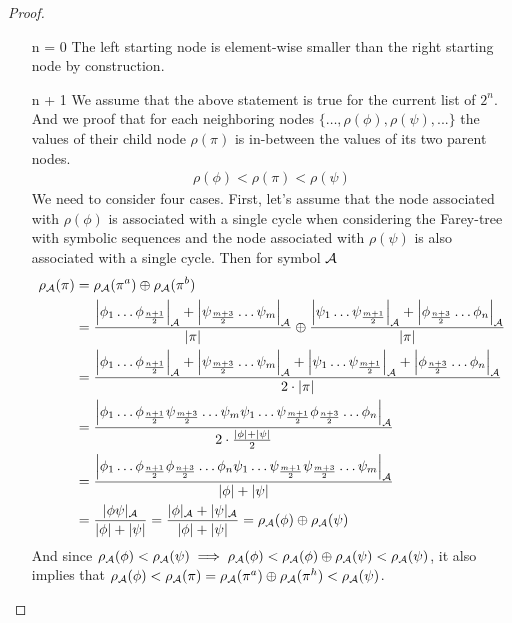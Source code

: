 \begin{proof}
	\begin{itemize}
		\item[n = 0] The left starting node is element-wise smaller than the right starting node by construction.
		\item[n + 1] We assume that the above statement is true for the current list of $2^n$.
			And we proof that for each neighboring nodes $\{\dots ,\rho(\phi), \rho(\psi), ...\}$ the values of their child node $\rho(\pi)$ is in-between the values of its two parent nodes.
			\begin{align*}
				\rho(\phi) < \rho(\pi) < \rho(\psi)
			\end{align*}
			We need to consider four cases.
			First, let's assume that the node associated with $\rho(\phi)$ is associated with a single cycle when considering the Farey-tree with symbolic sequences and the node associated with $\rho(\psi)$ is also associated with a single cycle.
			Then for symbol $\mathcal{A}$
			\begin{align*}
				\rho_{\mathcal{A}}(\pi) & = \rho_{\mathcal{A}}(\pi^a) \oplus \rho_{\mathcal{A}}(\pi^b)                                                                       \\
				             & =
				\dfrac{\left|\phi_1 \dots \phi_{\frac{n+1}{2}}\right|_{\mathcal{A}} + \left|\psi_{\frac{m+3}{2}} \dots \psi_m\right|_{\mathcal{A}}}{|\pi|}
				\oplus \dfrac{\left|\psi_1 \dots \psi_{\frac{m+1}{2}}\right|_{\mathcal{A}} + \left|\phi_{\frac{n+3}{2}} \dots \phi_n\right|_{\mathcal{A}}}{|\pi|} \\
				             & =
				\dfrac
				{\left|\phi_1 \dots \phi_{\frac{n+1}{2}}\right|_{\mathcal{A}} + \left|\psi_{\frac{m+3}{2}} \dots \psi_m\right|_{\mathcal{A}} + \left|\psi_1 \dots \psi_{\frac{m+1}{2}}\right|_{\mathcal{A}} + \left|\phi_{\frac{n+3}{2}} \dots \phi_n\right|_{\mathcal{A}}}
				{2 \cdot |\pi|}                                                                                                             \\
				             & =
				\dfrac
				{\left|\phi_1 \dots \phi_{\frac{n+1}{2}} \psi_{\frac{m+3}{2}} \dots \psi_m \psi_1 \dots \psi_{\frac{m+1}{2}} \phi_{\frac{n+3}{2}} \dots \phi_n\right|_{\mathcal{A}}}
				{2 \cdot \frac{|\phi| + |\psi|}{2}}                                                                                         \\
				             & =
				\dfrac
				{\left|\phi_1 \dots \phi_{\frac{n+1}{2}} \phi_{\frac{n+3}{2}} \dots \phi_n \psi_1 \dots \psi_{\frac{m+1}{2}} \psi_{\frac{m+3}{2}} \dots \psi_m\right|_{\mathcal{A}}}
				{|\phi| + |\psi|}                                                                                                           \\
				             &
				= \dfrac{|\phi\psi|_{\mathcal{A}}}{|\phi| + |\psi|}
				= \dfrac{|\phi|_{\mathcal{A}} + |\psi|_{\mathcal{A}}}{|\phi| + |\psi|}
				= \rho_{\mathcal{A}}(\phi) \oplus \rho_{\mathcal{A}}(\psi)
			\end{align*}
			And since $\rho_{\mathcal{A}}(\phi) < \rho_{\mathcal{A}}(\psi) \implies \rho_{\mathcal{A}}(\phi) < \rho_{\mathcal{A}}(\phi) \oplus \rho_{\mathcal{A}}(\psi) < \rho_{\mathcal{A}}(\psi)$,
			it also implies that $\rho_{\mathcal{A}}(\phi) < \rho_{\mathcal{A}}(\pi) =  \rho_{\mathcal{A}}(\pi^a) \oplus \rho_{\mathcal{A}}(\pi^h) < \rho_{\mathcal{A}}(\psi)$.


\end{itemize}
\end{proof}
